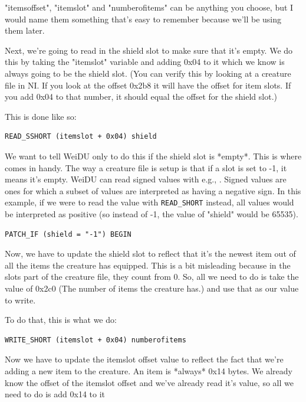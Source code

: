 \documentclass{article}
\def\ttref#1{\ahrefloc{#1}{\tt #1}}
\def\t#1{{\tt #1}}
\begin{document}
"itemsoffset", "itemslot" and "numberofitems" can be anything you choose, but I
would name them something that's easy to remember because we'll be using
them later.

Next, we're going to read in the shield slot to make sure that it's empty.
We do this by taking the "itemslot" variable and adding 0x04 to it which we
know is always going to be the shield slot.  (You can verify this by
looking at a creature file in NI.  If you look at the offset 0x2b8 it will
have the offset for item slots.  If you add 0x04 to that number, it should
equal the offset for the shield slot.)

This is done like so:

\begin{verbatim}
READ_SSHORT (itemslot + 0x04) shield
\end{verbatim}

We want to tell WeiDU only to do this if the shield slot is
*empty*.  This is where \ttref{PATCH_IF} comes in handy.  The way a creature
file is setup is that if a slot is set to -1, it means it's empty.  WeiDU can
read signed values with e.g., \ttref{READ_SSHORT}. Signed values are ones for
which a subset of values are interpreted as having a negative sign. In this
example, if we were to read the value with \t{READ_SHORT} instead, all values
would be interpreted as positive (so instead of -1, the value of "shield" would
be 65535).

\begin{verbatim}
PATCH_IF (shield = "-1") BEGIN
\end{verbatim}

Now, we have to update the shield slot to reflect that it's the newest item
out of all the items the creature has equipped.  This is a bit misleading
because in the slots part of the creature file, they count from 0.  So, all
we need to do is take the value of 0x2c0 (The number of items the creature
has.) and use that as our value to write.

To do that, this is what we do:

\begin{verbatim}
WRITE_SHORT (itemslot + 0x04) numberofitems
\end{verbatim}

Now we have to update the itemslot offset value to reflect the fact that
we're adding a new item to the creature.  An item is *always* 0x14 bytes.
We already know the offset of the itemslot offset and we've already read
it's value, so all we need to do is add 0x14 to it
\end{document}
